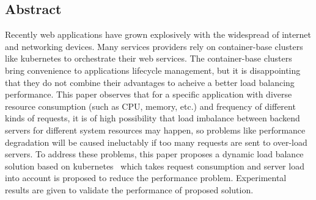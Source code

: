 \subsection*{Abstract}
\hspace{0pt}
Recently web applications have grown explosively with the widespread of internet and networking devices. Many services providers rely on container-base clusters like kubernetes to orchestrate their web services. The container-base clusters bring convenience to applications lifecycle management, but it is disappointing that they do not combine their advantages to acheive a better load balancing performance. This paper observes that for a specific application with diverse resource consumption (such as CPU, memory, etc.) and frequency of different kinds of requests, it is of high possibility that load imbalance between backend servers for different system resources may happen, so problems like performance degradation will be caused ineluctably if too many requests are sent to over-load servers. To address these problems, this paper proposes a dynamic load balance solution based on kubernetes~{\cite{Wilkes2016Borg}} which takes request consumption and server load into account is proposed to reduce the performance problem. Experimental results are given to validate the performance of proposed solution.
